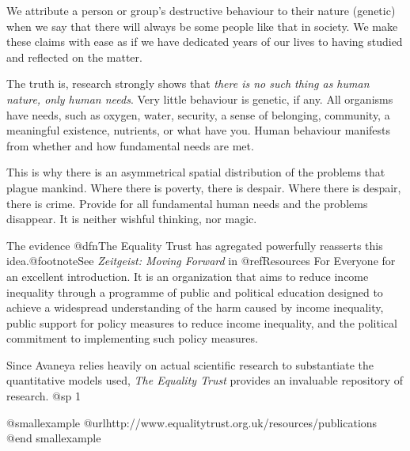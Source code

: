 
We attribute a person or group's destructive behaviour to their nature (genetic) when we say that there will always be some people like that in society. We make these claims with ease as if we have dedicated years of our lives to having studied and reflected on the matter.

The truth is, research strongly shows that {\sl there is no such thing as human nature, only human needs}. Very little behaviour is genetic, if any. All organisms have needs, such as oxygen, water, security, a sense of belonging, community, a meaningful existence, nutrients, or what have you. Human behaviour manifests from whether and how fundamental needs are met.

This is why there is an asymmetrical spatial distribution of the problems that plague mankind. Where there is poverty, there is despair. Where there is despair, there is crime. Provide for all fundamental human needs and the problems disappear. It is neither wishful thinking, nor magic.

The evidence @dfn{The Equality Trust} has agregated powerfully reasserts this idea.@footnote{See {\sl Zeitgeist: Moving Forward} in @ref{Resources For Everyone} for an excellent introduction.} It is an organization that aims to reduce income inequality through a programme of public and political education designed to achieve a widespread understanding of the harm caused by income inequality, public support for policy measures to reduce income inequality, and the political commitment to implementing such policy measures. 

Since Avaneya relies heavily on actual scientific research to substantiate the quantitative models used, {\sl The Equality Trust} provides an invaluable repository of research.
@sp 1

@smallexample
@url{http://www.equalitytrust.org.uk/resources/publications}
@end smallexample

